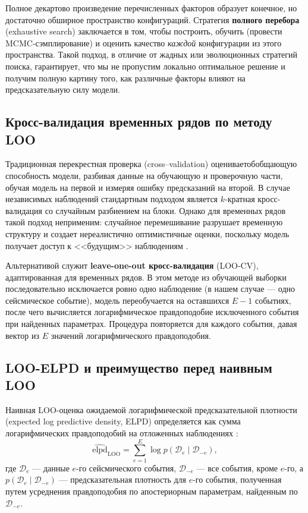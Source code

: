 \documentclass[14pt]{mmcs_article}
\begin{document}
	Полное декартово произведение перечисленных факторов образует
	конечное, но достаточно обширное пространство конфигураций.
	Стратегия \textbf{полного перебора} (exhaustive search)
	заключается в том, чтобы построить, обучить (провести
	MCMC-сэмплирование) и оценить качество \textit{каждой}
	конфигурации из этого пространства. Такой подход, в отличие от
	жадных или эволюционных стратегий поиска, гарантирует, что мы
	не пропустим локально оптимальное решение и получим полную
	картину того, как различные факторы влияют на предсказательную
	силу модели.
	
	\subsection*{Кросс-валидация временных рядов по методу LOO}
	
	Традиционная перекрестная проверка (cross--validation)
	оценивает\linebreak обобщающую способность модели, разбивая данные на
	обучающую и проверочную части, обучая модель на первой и
	измеряя ошибку предсказаний на второй. В случае независимых
	наблюдений стандартным подходом является $k$-кратная
	кросс-валидация со случайным разбиением на блоки. Однако для
	временных рядов такой подход неприменим: случайное
	перемешивание разрушает временную структуру и создает
	нереалистично оптимистичные оценки, поскольку модель получает
	доступ к <<будущим>> наблюдениям \cite{Bergmeir2012}.
	
	Альтернативой служит \textbf{leave-one-out кросс-валидация}
	(LOO-CV), адаптированная для временных рядов. В этом методе из
	обучающей выборки последовательно исключается ровно одно
	наблюдение (в нашем случае — одно сейсмическое событие),
	модель переобучается на оставшихся $E-1$ событиях, после чего
	вычисляется логарифмическое правдоподобие исключенного события
	при найденных параметрах. Процедура повторяется для каждого
	события, давая вектор из $E$ значений логарифмического
	правдоподобия.
	
	\subsection*{LOO-ELPD и преимущество перед наивным LOO}
	
	Наивная LOO-оценка ожидаемой логарифмической предсказательной
	плотности (expected log predictive density, ELPD) определяется
	как сумма логарифмических правдоподобий на отложенных
	наблюдениях \cite{Vehtari2017}:
	\begin{equation}\label{eq:naive_elpd}
		\widehat{\mathrm{elpd}}_{\mathrm{LOO}} = 
		\sum_{e=1}^{E} \log p(\mathcal{D}_e \mid \mathcal{D}_{-e}),
	\end{equation}
	где $\mathcal{D}_e$ — данные $e$-го сейсмического события,
	$\mathcal{D}_{-e}$ — все события, кроме $e$-го, а
	$p(\mathcal{D}_e \mid \mathcal{D}_{-e})$ — предсказательная
	плотность для $e$-го события, полученная путем усреднения
	правдоподобия по апостериорным параметрам, найденным по
	$\mathcal{D}_{-e}$.
	
\end{document}
